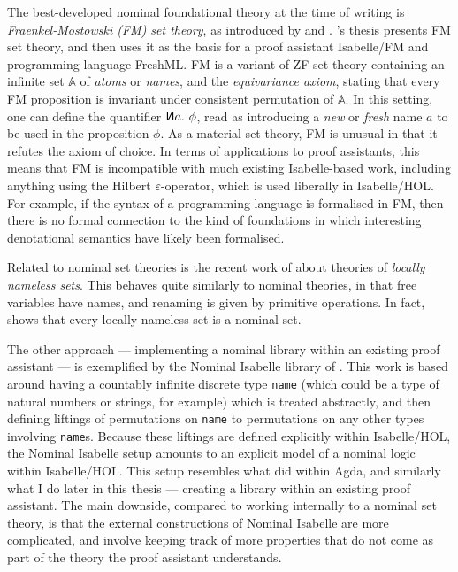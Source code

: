 The best-developed nominal foundational theory at the time of writing is
\emph{Fraenkel-Mostowski (FM) set theory}, as introduced by
\citet{Gabbay-thesis} and \citet{GP02}.
\citeauthor{Gabbay-thesis}'s thesis presents FM set theory, and then uses it as
the basis for a proof assistant Isabelle/FM and programming language FreshML\@.
FM is a variant of ZF set theory containing an infinite set $\mathbb A$ of
\emph{atoms} or \emph{names}, and the \emph{equivariance axiom}, stating that
every FM proposition is invariant under consistent permutation of $\mathbb A$.
In this setting, one can define the quantifier
$\reflectbox{$\mathsf N$}a.~\phi$,
read as introducing a \emph{new} or \emph{fresh} name $a$ to be used in the
proposition $\phi$.
As a material set theory, FM is unusual in that it refutes the axiom of choice.
In terms of applications to proof assistants, this means that FM is incompatible
with much existing Isabelle-based work, including anything using the Hilbert
$\varepsilon$-operator, which is used liberally in Isabelle/HOL\@.
For example, if the syntax of a programming language is formalised in FM, then
there is no formal connection to the kind of foundations in which interesting
denotational semantics have likely been formalised.

Related to nominal set theories is the recent work of \citet{Pitts23} about
theories of \emph{locally nameless sets}.
This behaves quite similarly to nominal theories, in that free variables have
names, and renaming is given by primitive operations.
In fact, \citet{Pitts23} shows that every locally nameless set is a nominal set.

The other approach --- implementing a nominal library within an existing proof
assistant --- is exemplified by the Nominal Isabelle library of \citet{Urban08}.
This work is based around having a countably infinite discrete type
\texttt{name} (which could be a type of natural numbers or strings, for example)
which is treated abstractly, and then defining liftings of permutations on
\texttt{name} to permutations on any other types involving \texttt{name}s.
Because these liftings are defined explicitly within Isabelle/HOL, the Nominal
Isabelle setup amounts to an explicit model of a nominal logic within
Isabelle/HOL\@.
This setup resembles what \citet{AACMM21} did within Agda, and similarly what I
do later in this thesis --- creating a library within an existing proof
assistant.
The main downside, compared to working internally to a nominal set theory, is
that the external constructions of Nominal Isabelle are more complicated, and
involve keeping track of more properties that do not come as part of the theory
the proof assistant understands.

